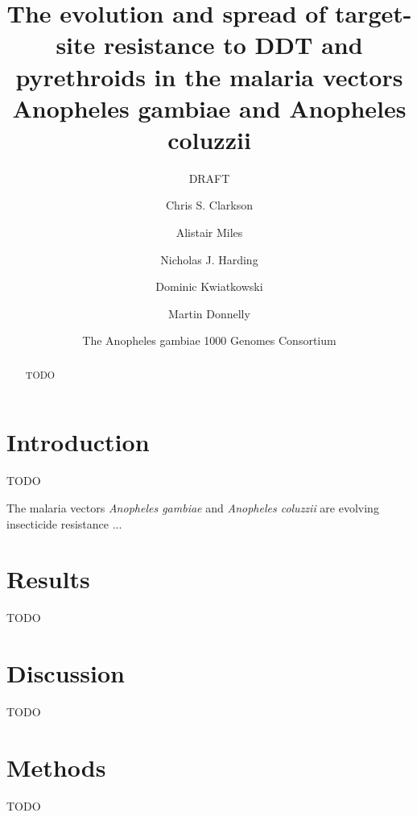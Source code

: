 \documentclass[a4paper,11pt,abstracton]{scrartcl}
\title{The evolution and spread of target-site resistance to DDT and 
pyrethroids in the malaria vectors Anopheles gambiae and Anopheles coluzzii}
\subtitle{DRAFT}
\author{
	Chris S. Clarkson
	\and 
	Alistair Miles
	\and
	Nicholas J. Harding
	\and
	Dominic Kwiatkowski
	\and
	Martin Donnelly
	\and
	The Anopheles gambiae 1000 Genomes Consortium
}
\begin{document}
\maketitle

\begin{abstract}

TODO

\end{abstract}

\section{Introduction}

TODO

The malaria vectors \emph{Anopheles gambiae} and \emph{Anopheles coluzzii} are 
evolving insecticide resistance ...

\section{Results}

TODO

\section{Discussion}

TODO

\section{Methods}

TODO
\end{document}
